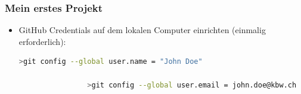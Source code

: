 \documentclass[table]{beamer}
\begin{document}
    \begin{frame}
        \frametitle{Mein erstes Projekt}

        \begin{itemize}
            \item GitHub Credentials auf dem lokalen Computer einrichten
            (einmalig erforderlich):

            \begin{lstlisting}[language=Bash]
                >git config --global user.name = "John Doe"

                >git config --global user.email = john.doe@kbw.ch
            \end{lstlisting}


        \end{itemize}
    
        
    
    \end{frame}

    
        
    
    
\end{document}
